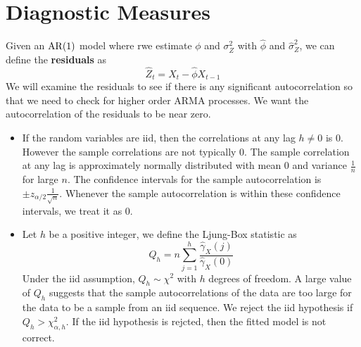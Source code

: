 

\chapter{Diagnostic Measures}

Given an $\operatorname{AR}(1)$ model where rwe estimate $\phi$ and $\sigma_Z^2$ with $\hat{\phi}$ and $\hat{\sigma}_Z^2$, we can define the \textbf{residuals} as
\[\hat{Z}_t = X_{t} - \hat{\phi}X_{t-1}\]
We will examine the residuals to see if there is any significant autocorrelation so that we need to check for higher order ARMA processes. We want the autocorrelation of the residuals to be near zero.

\begin{itemize}
    \item If the random variables are iid, then the correlations at any lag $h \neq 0$ is 0. However the sample correlations are not typically 0. The sample correlation at any lag is approximately normally distributed with mean 0 and variance $\frac{1}{n}$ for large $n$. The confidence intervals for the sample autocorrelation is $\pm z_{\alpha/2}\frac{1}{\sqrt{n}}$. Whenever the sample autocorrelation is within these confidence intervals, we treat it as 0.
    \item Let $h$ be a positive integer, we define the Ljung-Box statistic as
    \[Q_h = n\sum_{j=1}^h \frac{\hat{\gamma}_X(j)}{\hat{\gamma}_X(0)}\]
    Under the iid assumption, $Q_h \sim \chi^2$ with $h$ degrees of freedom. A large value of $Q_h$ suggests that the sample autocorrelations of the data are too large for the data to be a sample from an iid sequence. We reject the iid hypothesis if $Q_h > \chi^2_{\alpha,h}$. If the iid hypothesis is rejcted, then the fitted model is not correct.
\end{itemize}